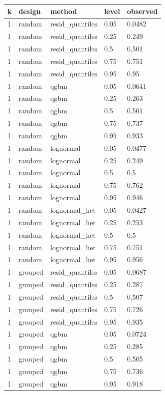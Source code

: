 \begin{tabular}{lllll}
\toprule
k & design & method & level & observed \\
\midrule
1 & random & resid\_quantiles & 0.05 & 0.0482 \\
1 & random & resid\_quantiles & 0.25 & 0.249 \\
1 & random & resid\_quantiles & 0.5 & 0.501 \\
1 & random & resid\_quantiles & 0.75 & 0.751 \\
1 & random & resid\_quantiles & 0.95 & 0.95 \\
1 & random & qgbm & 0.05 & 0.0641 \\
1 & random & qgbm & 0.25 & 0.263 \\
1 & random & qgbm & 0.5 & 0.501 \\
1 & random & qgbm & 0.75 & 0.737 \\
1 & random & qgbm & 0.95 & 0.933 \\
1 & random & lognormal & 0.05 & 0.0477 \\
1 & random & lognormal & 0.25 & 0.249 \\
1 & random & lognormal & 0.5 & 0.5 \\
1 & random & lognormal & 0.75 & 0.762 \\
1 & random & lognormal & 0.95 & 0.946 \\
1 & random & lognormal\_het & 0.05 & 0.0427 \\
1 & random & lognormal\_het & 0.25 & 0.253 \\
1 & random & lognormal\_het & 0.5 & 0.5 \\
1 & random & lognormal\_het & 0.75 & 0.751 \\
1 & random & lognormal\_het & 0.95 & 0.956 \\
1 & grouped & resid\_quantiles & 0.05 & 0.0687 \\
1 & grouped & resid\_quantiles & 0.25 & 0.287 \\
1 & grouped & resid\_quantiles & 0.5 & 0.507 \\
1 & grouped & resid\_quantiles & 0.75 & 0.726 \\
1 & grouped & resid\_quantiles & 0.95 & 0.935 \\
1 & grouped & qgbm & 0.05 & 0.0724 \\
1 & grouped & qgbm & 0.25 & 0.285 \\
1 & grouped & qgbm & 0.5 & 0.505 \\
1 & grouped & qgbm & 0.75 & 0.736 \\
1 & grouped & qgbm & 0.95 & 0.918 \\

\end{tabular}
